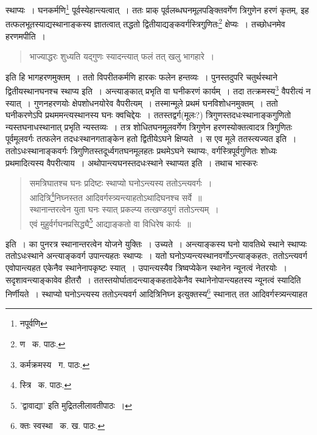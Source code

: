 \documentclass[11pt, openany]{book}
\begin{document}
\noindent स्थाप्यः~। घनकर्मणि\renewcommand{\thefootnote}{१}\footnote{नपूर्वणि} पूर्वस्येहान्त्यत्वात्~। ततः प्राक् पूर्वलब्धघनमूलपङ्क्तिवर्गेण त्रिगुणेन हरणं कृतम्, इह तत्फलभूतस्याद्यस्थानाङ्कस्य ज्ञातत्वात् तद्धतो द्वितीयाद्यङ्कवर्गस्त्रिगुणितः\renewcommand{\thefootnote}{२}\footnote{ण \textendash\ क. पाठः.} क्षेप्यः~। तच्छोधनमेव हरणमपीति~।
\begin{quote}
{\qt भाज्याद्धरः शुध्यति यद्गुणः स्यादन्त्यात् फलं तत् खलु भागहारे~।}
\end{quote}
\noindent इति हि भागहरणमुक्तम्~। ततो विपरीतकर्मणि हारकः फलेन हन्तव्यः~। पुनस्तदुपरि चतुर्थस्थाने द्वितीयस्थानघनश्च स्थाप्य इति~। अन्त्याङ्कात् प्रभृति वा घनीकरणं कार्यम्~। तदा तत्क्रमस्य\renewcommand{\thefootnote}{३}\footnote{कर्मक्रमस्य \textendash\ ग. पाठः.} वैपरीत्यं न स्यात्~। गुणनहरणयोः क्षेपशोधनयोरेव वैपरीत्यम्~। तस्मान्मूले प्रथमं घनविशोधनमुक्तम्~। ततो घनीकरणेऽपि प्रथममन्त्यस्थानस्य घनः क्वचिद्देयः~। ततस्तद्वर्ग(मूलः?) त्रिगुणस्तदधःस्थानाङ्कगुणितो न्यस्तघनाधस्थानात् प्रभृति न्यस्तव्यः~। तत्र शोधितघनमूलवर्गेण त्रिगुणेन हरणस्योक्तत्वादत्र त्रिगुणितः पूर्वमूलवर्गः तत्फलेन तदधःस्थानगताङ्केन हतो द्वितीयेऽघने क्षिप्यते~। स एव मूले ततस्त्यज्यत इति~। ततोऽधःस्थानाङ्कवर्गः त्रिगुणितस्तदूर्ध्वगतघनमूलहतः प्रथमेऽघने स्थाप्यः, वर्गस्त्रिपूर्वगुणितः शोध्यः प्रथमादित्यस्य वैपरीत्याय~। अथोपान्त्यघनस्तदधःस्थाने स्थाप्यत इति~। तथाच भास्करः\textendash 

\begin{quote}
{\qt समत्रिघातश्च घनः प्रदिष्टः स्थाप्यो घनोऽन्त्यस्य ततोऽन्त्यवर्गः~।\\
आदित्रि\renewcommand{\thefootnote}{३}\footnote{स्त्रि \textendash\ क. पाठः.}निघ्नस्तत आदिवर्गस्त्र्यन्त्याहतोऽथादिघनश्च सर्वे~॥\\
स्थानान्तरत्वेन युता घनः स्यात् प्रकल्प्य तत्खण्डयुगं ततोऽन्त्यम्~।\\
एवं मुहुर्वर्गघनप्रसिद्ध्यै\renewcommand{\thefootnote}{*}\footnote{'द्वावाद्या' इति मुद्रितलीलावतीपाठः~।} आद्याङ्कतो वा विधिरेष कार्यः~॥}
\end{quote}

\noindent इति~। का पुनरत्र स्थानान्तरत्वेन योजने युक्तिः~। उच्यते~। अन्त्याङ्कस्य घनो यावतिथे स्थाने स्थाप्यः ततोऽधःस्थाने अन्त्याङ्कवर्ग उपान्त्यहतः स्थाप्यः~। यतो घनोऽप्यन्त्यस्थानवर्गोऽन्त्याङ्कहतः, ततोऽन्त्यवर्ग एवोपान्त्यहत एकेनैव स्थानेनापकृष्टः स्यात्~। उपान्त्यस्यैव त्रिष्वप्येकेन स्थानेन न्यूनत्वं नेतरयोः~। सदृशावन्त्याङ्कावेव हीतरौ~। ततस्तयोर्घातादन्त्याङ्कहतादेकेनैव स्थानेनोपान्त्यहतस्य न्यूनत्वं स्यादिति निर्णीयते~। स्थाप्यो घनोऽन्त्यस्य ततोऽन्त्यवर्ग आदित्रिनिघ्न इत्युक्तस्य\renewcommand{\thefootnote}{५}\footnote{क्तः स्वस्था \textendash\ क. ख. पाठः.} स्थानात् तत आदिवर्गस्त्र्यन्त्याहत 
\end{document}
